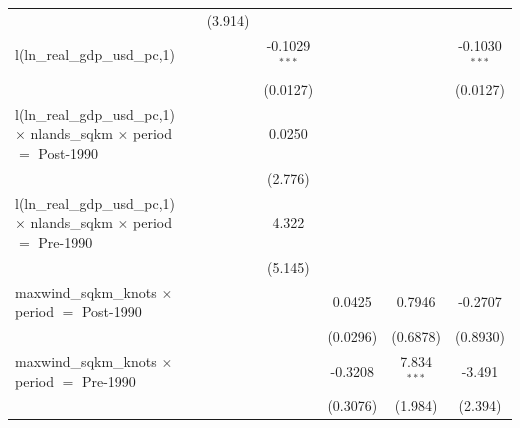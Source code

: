 \begin{tabular}{lcccccc}
                                                                                                   &               & (3.914)                 &                 &          &                         &   \\   
   l(ln\_real\_gdp\_usd\_pc,1)                                                                     &               &                         & -0.1029$^{***}$ &          &                         & -0.1030$^{***}$\\   
                                                                                                   &               &                         & (0.0127)        &          &                         & (0.0127)\\   
   l(ln\_real\_gdp\_usd\_pc,1) $\times$ nlands\_sqkm $\times$ period $=$ Post-1990                 &               &                         & 0.0250          &          &                         &   \\   
                                                                                                   &               &                         & (2.776)         &          &                         &   \\   
   l(ln\_real\_gdp\_usd\_pc,1) $\times$ nlands\_sqkm $\times$ period $=$ Pre-1990                  &               &                         & 4.322           &          &                         &   \\   
                                                                                                   &               &                         & (5.145)         &          &                         &   \\   
   maxwind\_sqkm\_knots $\times$ period $=$ Post-1990                                              &               &                         &                 & 0.0425   & 0.7946                  & -0.2707\\   
                                                                                                   &               &                         &                 & (0.0296) & (0.6878)                & (0.8930)\\   
   maxwind\_sqkm\_knots $\times$ period $=$ Pre-1990                                               &               &                         &                 & -0.3208  & 7.834$^{***}$           & -3.491\\   
                                                                                                   &               &                         &                 & (0.3076) & (1.984)                 & (2.394)\\   

\end{tabular}
